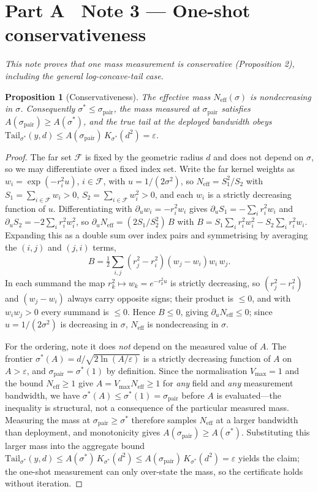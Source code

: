 \documentclass[10pt,twocolumn]{article}
\newtheorem{proposition}{Proposition}
\newcommand{\sstar}{\sigma^{*}}
\newcommand{\Neff}{N_{\mathrm{eff}}}
\begin{document}
\section*{Part A \textperiodcentered\ Note 3 --- One-shot conservativeness}
\emph{This note proves that one mass measurement is conservative (Proposition 2), including the general log-concave-tail case.}
\begin{proposition}[Conservativeness]
The effective mass $\Neff(\sigma)$ is nondecreasing in $\sigma$. Consequently $\sstar\le\sigma_{\mathrm{pair}}$, the mass measured at $\sigma_{\mathrm{pair}}$ satisfies $A(\sigma_{\mathrm{pair}})\ge A(\sstar)$, and the true tail at the deployed bandwidth obeys $\mathrm{Tail}_{\sstar}(y,d)\le A(\sigma_{\mathrm{pair}})\,K_{\sstar}(d^2)=\varepsilon$.
\end{proposition}
\begin{proof}
The far set $\mathcal{F}$ is fixed by the geometric radius $d$ and does not depend on $\sigma$, so we may differentiate over a fixed index set. Write the far kernel weights as $w_i=\exp(-r_i^2 u)$, $i\in\mathcal{F}$, with $u=1/(2\sigma^2)$, so $\Neff=S_1^2/S_2$ with $S_1=\sum_{i\in\mathcal{F}} w_i>0$, $S_2=\sum_{i\in\mathcal{F}} w_i^2>0$, and each $w_i$ is a strictly decreasing function of $u$. Differentiating with $\partial_u w_i=-r_i^2 w_i$ gives $\partial_u S_1=-\sum_i r_i^2 w_i$ and $\partial_u S_2=-2\sum_i r_i^2 w_i^2$, so $\partial_u\Neff=(2S_1/S_2^2)\,B$ with $B=S_1\sum_i r_i^2 w_i^2-S_2\sum_i r_i^2 w_i$. Expanding this as a double sum over index pairs and symmetrising by averaging the $(i,j)$ and $(j,i)$ terms,
\begin{equation}\label{eq:symm}
B=\tfrac{1}{2}\sum_{i,j}\left(r_j^2-r_i^2\right)\left(w_j-w_i\right)w_i\,w_j.
\end{equation}
In each summand the map $r_k^2\mapsto w_k=e^{-r_k^2 u}$ is strictly decreasing, so $(r_j^2-r_i^2)$ and $(w_j-w_i)$ always carry opposite signs; their product is $\le0$, and with $w_iw_j>0$ every summand is $\le0$. Hence $B\le0$, giving $\partial_u\Neff\le0$; since $u=1/(2\sigma^2)$ is decreasing in $\sigma$, $\Neff$ is nondecreasing in $\sigma$.

For the ordering, note it does \emph{not} depend on the measured value of $A$. The frontier $\sstar(A)=d/\sqrt{2\ln(A/\varepsilon)}$ is a strictly decreasing function of $A$ on $A>\varepsilon$, and $\sigma_{\mathrm{pair}}=\sstar(1)$ by definition. Since the normalisation $V_{\max}=1$ and the bound $\Neff\ge1$ give $A=V_{\max}\Neff\ge1$ for \emph{any} field and \emph{any} measurement bandwidth, we have $\sstar(A)\le\sstar(1)=\sigma_{\mathrm{pair}}$ before $A$ is evaluated---the inequality is structural, not a consequence of the particular measured mass. Measuring the mass at $\sigma_{\mathrm{pair}}\ge\sstar$ therefore samples $\Neff$ at a larger bandwidth than deployment, and monotonicity gives $A(\sigma_{\mathrm{pair}})\ge A(\sstar)$. Substituting this larger mass into the aggregate bound $\mathrm{Tail}_{\sstar}(y,d)\le A(\sstar)\,K_{\sstar}(d^2)\le A(\sigma_{\mathrm{pair}})\,K_{\sstar}(d^2)=\varepsilon$ yields the claim; the one-shot measurement can only over-state the mass, so the certificate holds without iteration.
\end{proof}
\end{document}
